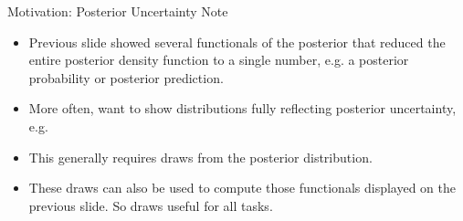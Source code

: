\documentclass[aspectratio=169, handout]{beamer}
\begin{document}
{\footnotesize
\begin{frame}{Motivation: Posterior Uncertainty}
Note
\begin{itemize}
  \item Previous slide showed several functionals of the posterior that
    reduced the entire posterior density function to a
    \alert{single number}, e.g. a posterior probability or posterior
    prediction.

  \item More often, want to show \alert{distributions} fully
    reflecting posterior uncertainty, e.g.

  \item This generally requires \alert{draws} from the posterior
    distribution.

  \item These draws can also be used to compute those functionals
    displayed on the previous slide.
    So draws useful for all tasks.
\end{itemize}
\end{frame}
}
\end{document}
